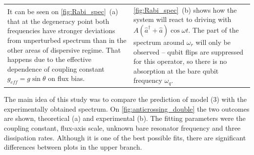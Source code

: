 \documentclass[a0, portrait]{a0poster}
\begin{document}
\begin{multicols}{2}
\begin{tcolorbox}[left=1cm, right=1cm, top=0.5cm, bottom=0.5cm, 
                  title={\Large Rabi model}, bottomtitle=.5cm, toptitle=.5cm
                  ]
\begin{minipage}{\textwidth}
\centering
{}
\label{fig:Rabi_spec}
\end{minipage}

\begin{minipage}{\textwidth}
\begin{tabular}{l@{\hspace{1cm}}l}
\parbox{0.5\textwidth}{It can be seen on \autoref{fig:Rabi_spec}~(a) that at the degeneracy point both frequencies have stronger deviations from unperturbed spectrum than in the other areas of dispersive regime. That happens due to the effective dependence of coupling constant $g_{eff} = g\sin\theta$ on flux bias.}
&
\parbox{0.45\textwidth}{\autoref{fig:Rabi_spec}~(b) shows how the system will react to driving with $A (\hat a^\dag + \hat a)\cos\omega t$. The part of the spectrum around $\omega_r$ will only be observed -- qubit flips are suppressed for this operator, so there is no absorption at the bare qubit frequency $\omega_q$.}\\
\end{tabular}
\end{minipage}
\end{tcolorbox}

\begin{tcolorbox}[left=1cm, right=1cm, top=0.5cm, bottom=0.5cm, 
                  title={\Large Anticrossings}, bottomtitle=.3cm,toptitle=.5cm
                  ]
\captionsetup[subfigure]{justification=centering}                  
                    
\begingroup
\setlength{\columnsep}{1cm}	
\begin{multicols}{2}
The main idea of this study was to compare the prediction of model (3) with the experimentally obtained spectrum. On \autoref{fig:anticrossing_double} the two outcomes are shown, theoretical (a) and experimental (b). The fitting parameters were the coupling constant, flux-axis scale, unknown bare resonator frequency and three dissipation rates. Although it is one of the best possible fits, there are significant differences between plots in the upper branch.  
\end{multicols}
\endgroup

\vspace{.5cm}
\begin{minipage}{\textwidth}


\end{minipage}
\end{tcolorbox}
\end{multicols}
\end{document}
